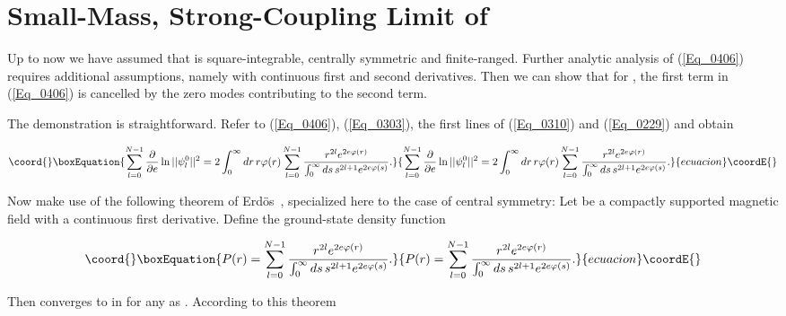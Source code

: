 \documentclass[a4paper,twocolumn,showpacs,preprintnumbers,amsmath,amssymb]{revtex4}
\providecommand{\pdo}[1]{\ensuremath{\frac{\partial }
        {\partial #1 }}}
\begin{document}
\section{\label{Sec_SecV}
Small-Mass, Strong-Coupling Limit of \coordHE{}}


Up to now we have assumed that \coordHE{} is square-integrable,
centrally symmetric and finite-ranged. Further analytic analysis of
(\ref{Eq_0406}) requires additional assumptions, namely \coordHE{}
with continuous first and second derivatives. Then we can show that
for \coordHE{}, the first term in (\ref{Eq_0406}) is cancelled
by the zero modes contributing to the second term.

The demonstration is straightforward. Refer to (\ref{Eq_0406}),
(\ref{Eq_0303}), the first lines of (\ref{Eq_0310}) and
(\ref{Eq_0229}) and obtain

\begin{widetext}
\begin{equation}\coord{}\boxEquation{
\label{Eq_0501}
\sum^{N-1}_{l=0} \pdo{e}\ln||\psi^0_l||^2
  = 2 \int^{\infty}_0 dr \, r \varphi(r)
    \sum^{N-1}_{l=0}
    \frac{r^{2l} e^{2e\varphi(r)}}
         {\int^{\infty}_0 ds \, s^{2l+1} e^{2e\varphi(s)}}.
}{
\sum^{N-1}_{l=0} \pdo{e}\ln||\psi^0_l||^2
  = 2 \int^{\infty}_0 dr \, r \varphi(r)
    \sum^{N-1}_{l=0}
    \frac{r^{2l} e^{2e\varphi(r)}}
         {\int^{\infty}_0 ds \, s^{2l+1} e^{2e\varphi(s)}}.
}{ecuacion}\coordE{}\end{equation}
\end{widetext}

\noindent
Now make use of the following theorem of Erd\"{o}s~\cite{Erdos93},
specialized here to the case of central symmetry: Let \coordHE{} be a
compactly supported magnetic field with a continuous first
derivative. Define the ground-state density function

\begin{equation}\coord{}\boxEquation{
\label{Eq_0502}
P(r) = \sum^{N-1}_{l=0}
  \frac{r^{2l} e^{2e\varphi(r)}}
       {\int^{\infty}_0 ds \, s^{2l+1} e^{2e\varphi(s)}}.
}{
P(r) = \sum^{N-1}_{l=0}
  \frac{r^{2l} e^{2e\varphi(r)}}
       {\int^{\infty}_0 ds \, s^{2l+1} e^{2e\varphi(s)}}.
}{ecuacion}\coordE{}\end{equation}

\noindent
Then \coordHE{} converges to \coordHE{} in \coordHE{}  for any \coordHE{}
as \coordHE{}. According to this theorem
\end{document}
